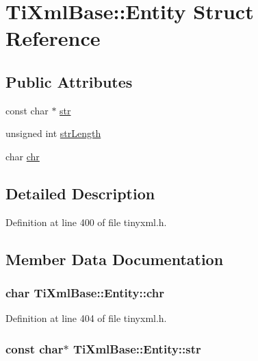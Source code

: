 \hypertarget{struct_ti_xml_base_1_1_entity}{
\section{TiXmlBase::Entity Struct Reference}
\label{struct_ti_xml_base_1_1_entity}
}
\subsection*{Public Attributes}
\begin{DoxyCompactItemize}
\item 
const char $\ast$ \hyperlink{struct_ti_xml_base_1_1_entity_ab721b5d4f7ed144ffd215947b38258b7}{str}
\item 
unsigned int \hyperlink{struct_ti_xml_base_1_1_entity_a22e8d820894d3360b01fed110badb876}{strLength}
\item 
char \hyperlink{struct_ti_xml_base_1_1_entity_a2a7e1e68b93b4f76255c60c8fa7f738e}{chr}
\end{DoxyCompactItemize}


\subsection{Detailed Description}


Definition at line 400 of file tinyxml.h.



\subsection{Member Data Documentation}
\hypertarget{struct_ti_xml_base_1_1_entity_a2a7e1e68b93b4f76255c60c8fa7f738e}{
\subsubsection[{chr}]{\setlength{\rightskip}{0pt plus 5cm}char {\bf TiXmlBase::Entity::chr}}}
\label{struct_ti_xml_base_1_1_entity_a2a7e1e68b93b4f76255c60c8fa7f738e}


Definition at line 404 of file tinyxml.h.

\hypertarget{struct_ti_xml_base_1_1_entity_ab721b5d4f7ed144ffd215947b38258b7}{
\subsubsection[{str}]{\setlength{\rightskip}{0pt plus 5cm}const char$\ast$ {\bf TiXmlBase::Entity::str}}}
\label{struct_ti_xml_base_1_1_entity_ab721b5d4f7ed144ffd215947b38258b7}


